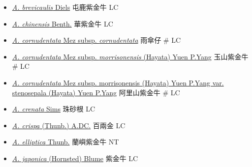 \begin{itemize}
  \begin{itemize}
        \item[] \href{http://www.theplantlist.org/tpl1.1/search?q=Ardisia+brevicaulis}{\textit{A. brevicaulis} Diels}   屯鹿紫金牛   LC
        \item[] \href{http://www.theplantlist.org/tpl1.1/search?q=Ardisia+chinensis}{\textit{A. chinensis} Benth.}   華紫金牛   LC
        \item[] \href{http://www.theplantlist.org/tpl1.1/search?q=Ardisia+cornudentata+subsp.+cornudentata}{\textit{A. cornudentata} Mez subsp. \textit{cornudentata}}   雨傘仔  \# LC
        \item[] \href{http://www.theplantlist.org/tpl1.1/search?q=Ardisia+cornudentata+subsp.+morrisonensis}{\textit{A. cornudentata} Mez subsp. \textit{morrisonensis} (Hayata) Yuen P.Yang}   玉山紫金牛  \# LC
        \item[] \href{http://www.theplantlist.org/tpl1.1/search?q=Ardisia+cornudentata+subsp.+morrisonensis+var.+stenosepala}{\textit{A. cornudentata} Mez subsp. morrisonensis (Hayata) Yuen P.Yang var. stenosepala (Hayata) Yuen P.Yang}   阿里山紫金牛  \# LC
        \item[] \href{http://www.theplantlist.org/tpl1.1/search?q=Ardisia+crenata}{\textit{A. crenata} Sims}   珠砂根   LC
        \item[] \href{http://www.theplantlist.org/tpl1.1/search?q=Ardisia+crispa}{\textit{A. crispa} (Thunb.) A.DC.}   百兩金   LC
        \item[] \href{http://www.theplantlist.org/tpl1.1/search?q=Ardisia+elliptica}{\textit{A. elliptica} Thunb.}   蘭嶼紫金牛   NT
        \item[] \href{http://www.theplantlist.org/tpl1.1/search?q=Ardisia+japonica}{\textit{A. japonica} (Hornsted) Blume}   紫金牛   LC

\end{itemize}
\end{itemize}
